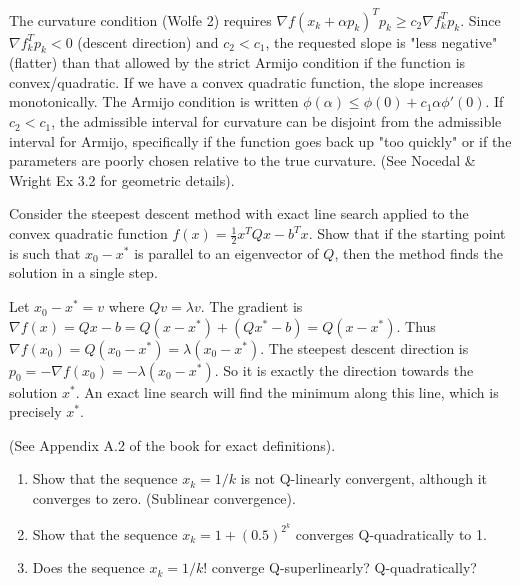 \begin{correction}
The curvature condition (Wolfe 2) requires $\nabla f(x_k + \alpha p_k)^T p_k \ge c_2 \nabla f_k^T p_k$.
Since $\nabla f_k^T p_k < 0$ (descent direction) and $c_2 < c_1$, the requested slope is "less negative" (flatter) than that allowed by the strict Armijo condition if the function is convex/quadratic.
If we have a convex quadratic function, the slope increases monotonically.
The Armijo condition is written $\phi(\alpha) \le \phi(0) + c_1 \alpha \phi'(0)$.
If $c_2 < c_1$, the admissible interval for curvature can be disjoint from the admissible interval for Armijo, specifically if the function goes back up "too quickly" or if the parameters are poorly chosen relative to the true curvature.
(See Nocedal \& Wright Ex 3.2 for geometric details).
\end{correction}
\bigskip

\bigskip
\begin{exercice}
Consider the steepest descent method with exact line search applied to the convex quadratic function $f(x) = \frac{1}{2}x^T Q x - b^T x$. 
Show that if the starting point is such that $x_0 - x^*$ is parallel to an eigenvector of $Q$, then the method finds the solution in a single step.
\end{exercice}

\begin{correction}
Let $x_0 - x^* = v$ where $Qv = \lambda v$.
The gradient is $\nabla f(x) = Qx - b = Q(x - x^*) + (Qx^* - b) = Q(x-x^*)$.
Thus $\nabla f(x_0) = Q(x_0 - x^*) = \lambda (x_0 - x^*)$.
The steepest descent direction is $p_0 = -\nabla f(x_0) = -\lambda (x_0 - x^*)$.
So it is exactly the direction towards the solution $x^*$.
An exact line search will find the minimum along this line, which is precisely $x^*$.
\end{correction}
\bigskip

\bigskip
\begin{exercice}
(See Appendix A.2 of the book for exact definitions). 
\begin{enumerate}
    \item Show that the sequence $x_k = 1/k$ is not Q-linearly convergent, although it converges to zero. (Sublinear convergence).
    \item Show that the sequence $x_k = 1 + (0.5)^{2^k}$ converges Q-quadratically to 1.
    \item Does the sequence $x_k = 1/k!$ converge Q-superlinearly? Q-quadratically?
\end{enumerate}
\end{exercice}

